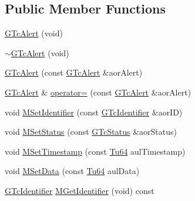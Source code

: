 \subsection*{Public Member Functions}
\begin{DoxyCompactItemize}
\item 
\mbox{\hyperlink{class_g_n_common_1_1_g_n_notification_1_1_g_tc_alert_ab4874dff7fccf2444439e7e5e4304125}{G\+Tc\+Alert}} (void)
\item 
\mbox{\hyperlink{class_g_n_common_1_1_g_n_notification_1_1_g_tc_alert_ad222cd054ec90b1aa8bf6e58e09d608b}{$\sim$\+G\+Tc\+Alert}} (void)
\item 
\mbox{\hyperlink{class_g_n_common_1_1_g_n_notification_1_1_g_tc_alert_a90f33fbcc71ed945ab1a0dee83bd3ccc}{G\+Tc\+Alert}} (const \mbox{\hyperlink{class_g_n_common_1_1_g_n_notification_1_1_g_tc_alert}{G\+Tc\+Alert}} \&aor\+Alert)
\item 
\mbox{\hyperlink{class_g_n_common_1_1_g_n_notification_1_1_g_tc_alert}{G\+Tc\+Alert}} \& \mbox{\hyperlink{class_g_n_common_1_1_g_n_notification_1_1_g_tc_alert_aba9a3373bd29884b049dfc525f655e5c}{operator=}} (const \mbox{\hyperlink{class_g_n_common_1_1_g_n_notification_1_1_g_tc_alert}{G\+Tc\+Alert}} \&aor\+Alert)
\item 
void \mbox{\hyperlink{class_g_n_common_1_1_g_n_notification_1_1_g_tc_alert_af2bfda50c172681df26c8d1fd060c853}{M\+Set\+Identifier}} (const \mbox{\hyperlink{class_g_n_common_1_1_g_n_notification_1_1_g_tc_identifier}{G\+Tc\+Identifier}} \&aor\+ID)
\item 
void \mbox{\hyperlink{class_g_n_common_1_1_g_n_notification_1_1_g_tc_alert_a92a7aae8f07d48ab0bc5d7256a8bc509}{M\+Set\+Status}} (const \mbox{\hyperlink{class_g_n_common_1_1_g_n_notification_1_1_g_tc_status}{G\+Tc\+Status}} \&aor\+Status)
\item 
void \mbox{\hyperlink{class_g_n_common_1_1_g_n_notification_1_1_g_tc_alert_a6ca7b4fb9db4072242edf7050c049176}{M\+Set\+Timestamp}} (const \mbox{\hyperlink{namespace_g_n_common_a9404ee6090c788ae70aebd1436ceb97d}{Tu64}} aul\+Timestamp)
\item 
void \mbox{\hyperlink{class_g_n_common_1_1_g_n_notification_1_1_g_tc_alert_a5b9fab9fd3113139d4a63894cd3758c9}{M\+Set\+Data}} (const \mbox{\hyperlink{namespace_g_n_common_a9404ee6090c788ae70aebd1436ceb97d}{Tu64}} aul\+Data)
\item 
\mbox{\hyperlink{class_g_n_common_1_1_g_n_notification_1_1_g_tc_identifier}{G\+Tc\+Identifier}} \mbox{\hyperlink{class_g_n_common_1_1_g_n_notification_1_1_g_tc_alert_a82925f40c7c9a36abea7a339d3329c9e}{M\+Get\+Identifier}} (void) const

\end{DoxyCompactItemize}
